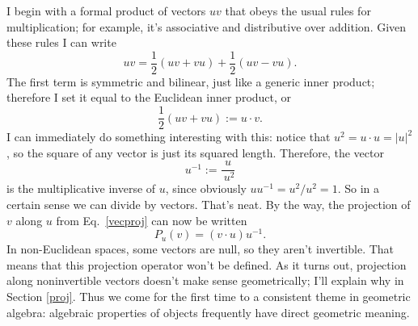 \documentclass{utarticle}
\DeclareMathOperator{\inp}{\cdot}
\newcommand{\half}{\ensuremath{\frac{1}{2}}}
\begin{document}
I begin with a formal product of vectors $uv$ that obeys the usual rules for multiplication;
for example, it's associative and distributive over addition.  Given these rules I can write
\begin{equation} uv = \half(uv+vu) + \half(uv-vu).   \label{decomp} \end{equation}
The first term is symmetric and bilinear, just like a generic inner 
product; therefore I set it equal to the Euclidean inner product, or
\begin{equation} \half(uv+vu) := u \inp v.   \end{equation}
I can immediately do something interesting with this: notice that $u^2 = u \inp u = |u|^2$, 
so the square of any vector is just its squared length.  Therefore, the vector
\begin{equation} u^{-1} := \frac{u}{\ u^2} \end{equation}
is the multiplicative inverse of $u$, since obviously $uu^{-1} = u^2 / u^2 = 1$.
So in a certain sense we can divide by vectors.  That's neat. By the way, the 
projection of $v$ along $u$ from Eq.~\eqref{vecproj} can now be written 
\begin{equation} 
P_u(v) = (v \inp u) u^{-1}.  
 \label{bettervecproj}
 \end{equation}
In non-Euclidean spaces, some vectors are null, so they aren't invertible.  That means 
that this projection operator won't be defined.  As it turns out, projection along noninvertible 
vectors doesn't make sense geometrically; I'll explain why in Section \ref{proj}.  Thus we 
come for the first time to a consistent theme in geometric algebra:  algebraic properties of 
objects frequently have direct geometric meaning.
\end{document}
